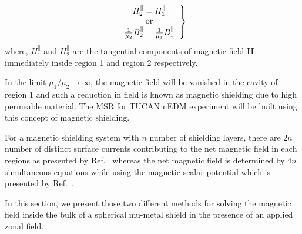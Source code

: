 \begin{equation}\label{b2}   
\left.
  \begin{tabular}{ccc}
  $H_2^\parallel=H_1^\parallel$\\
  or \\
  $\frac{1}{\mu_2}B_2^\parallel=\frac{1}{\mu_1}B_1^\parallel$
  \end{tabular}
 \right\}
\end{equation}
where, $H_1^\parallel$ and $H_2^\parallel$ are the tangential components of magnetic field $\bm{H}$ immediately inside region 1 and region 2 respectively.



In the limit $\mu_1/\mu_2\rightarrow\infty$, the magnetic field will be vanished in the cavity of region 1 and such a reduction in field is known as magnetic shielding due to high permeable material. The MSR for TUCAN nEDM experiment will be built using this concept of magnetic shielding. 

For a magnetic shielding system with $n$ number of shielding layers, there are $2n$ number of distinct surface currents contributing to the net magnetic field in each regions as presented by Ref.~\cite{CB1} whereas the net magnetic field is determined by $4n$ simultaneous equations while using the magnetic scalar potential which is presented by Ref.~\cite{jackson}.

In this section, we present those two different methods for solving the magnetic field inside the bulk of a spherical mu-metal shield in the presence of an applied zonal field. 

